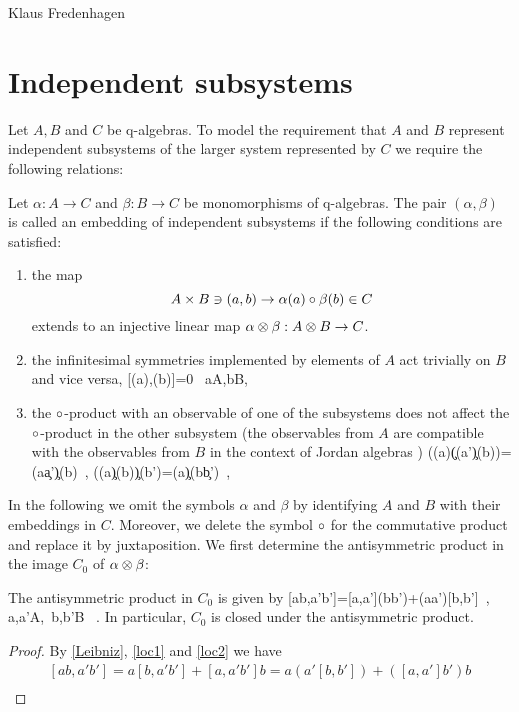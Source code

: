 \begin{artengenv}{Klaus Fredenhagen}
\section{Independent subsystems}
Let $A,B$ and $C$ be q-algebras.
To model the requirement that $A$ and $B$ represent independent subsystems of the larger system represented by $C$ we require the following relations:
\begin{definition-fred}\label{independent}
Let $\alpha:A\to C$ and $\beta:B\to C$ be monomorphisms of q-algebras. The pair $(\alpha,\beta)$ is called an embedding of independent subsystems if the following conditions are satisfied: 
\begin{enumerate}\label{composition}
\item the map
\[A\times B\ni(a,b)\to \alpha(a)\circ\beta(b)\in C \]
extends to an injective linear map  $\alpha\otimes\beta:A\otimes B\to C$.
\item the infinitesimal symmetries implemented by elements of $A$ act trivially on $B$ and vice versa,
 \be\label{loc1}[\alpha(a),\beta(b)]=0 \ \forall a\in A,b\in B, \ \ee
\item the $\circ$-product with an observable of one of the subsystems does not affect the $\circ$-product in the other subsystem (the observables from $A$ are compatible with the observables from $B$ in the context of Jordan algebras \parencite{HS})
\be\label{loc2}(\alpha(a)\c(\alpha(a')\c\beta(b))=\alpha(a\c a')\c\beta(b)\ , (\alpha(a)\c\beta(b))\c\beta(b')=\alpha(a)\c\beta(b\c b')\ ,\ee
\end{enumerate}
\end{definition-fred}
In the following we omit the symbols $\alpha$ and $\beta$ by identifying $A$ and $B$ with their embeddings in $C$. Moreover, we delete the symbol $\circ$ for the commutative product and replace it by juxtaposition. 
We first determine the antisymmetric product in the image $C_0$ of $\alpha\otimes\beta$:
\begin{lemma-fred}
The antisymmetric product in $C_0$ is given by
\be\label{LieC}[ab,a'b']=[a,a'](bb')+(aa')[b,b']\ , a,a'\in A,\ b,b'\in B \ .\ee
In particular, $C_0$ is closed under the antisymmetric product.
\end{lemma-fred}
\begin{proof}
By \eqref{Leibniz}, \eqref{loc1} and \eqref{loc2} we have
\begin{equation*}
\begin{split}
[ab,a'b']=a[b,a'b']+[a,a'b']b=a(a'[b,b'])+([a,a']b')b\\

\end{split}
\end{equation*}
\end{proof}
\end{artengenv}
